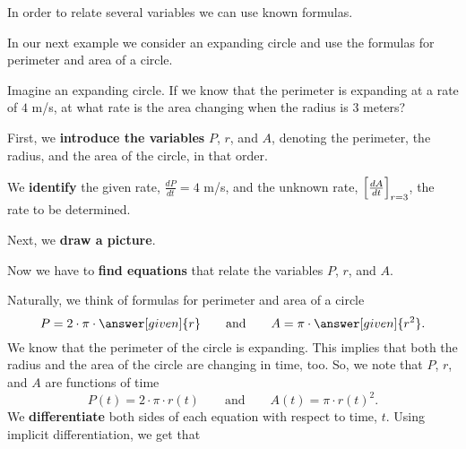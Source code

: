 \documentclass{ximera}
\begin{document}
In order to relate several variables we can use known formulas.

In our next example we consider an expanding circle and use the formulas for perimeter and area of a circle.

    \begin{image}
    \end{image}
\begin{example}
  Imagine an expanding circle. If we know that the perimeter is
  expanding at a rate of $4$ m/s, at what rate is the area changing
  when the radius is $3$ meters?
  \begin{explanation}
  
 

   First, we \textbf{introduce the variables} $P$, $r$, and $A$,  denoting the perimeter, the radius, and  the area of the circle, in that order. 
   
   We \textbf{identify} the given rate, $\frac{dP}{dt}=4$ m/s, and the unknown rate, $\Bigl[\frac{dA}{dt}\Bigr]_{r=3}$, the rate to be determined. 
   
    Next, we \textbf{draw a picture}.
    \begin{image}
    \end{image}
   Now we have to \textbf{find equations} that relate
   the variables $P$, $r$, and $A$. 
   
   Naturally, we think of formulas for perimeter and area of a circle
    \[
    P = 2\cdot \pi \cdot \answer[given]{r}
    \qquad\text{and}\qquad
    A = \pi \cdot \answer[given]{r^{2}}.
    \]
   We know that the perimeter of the circle is expanding. This implies that both the radius and the area of the circle are changing in time, too.
    So, we note that $P$, $r$, and $A$ are functions of time
    \[
    P(t) = 2\cdot \pi \cdot r(t)
    \qquad\text{and}\qquad
    A(t) = \pi \cdot r(t)^2.
    \]
    We \textbf{differentiate} both sides of each equation with respect to time, $t$.  Using implicit
    differentiation, we get that
    

\end{explanation}
\end{example}
\end{document}
